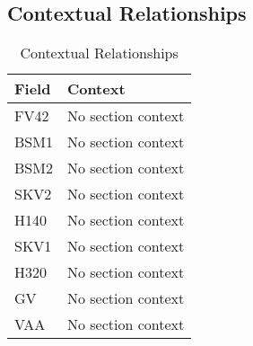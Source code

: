 \subsection{Contextual Relationships}

\begin{table}[h]
\centering
\begin{tabular}{l|l}
\hline
Field & Context \\
\hline
FV42 & No section context \\
BSM1 & No section context \\
BSM2 & No section context \\
SKV2 & No section context \\
H140 & No section context \\
SKV1 & No section context \\
H320 & No section context \\
GV & No section context \\
VAA & No section context \\
\hline
\end{tabular}
\caption{Contextual Relationships}
\end{table}

